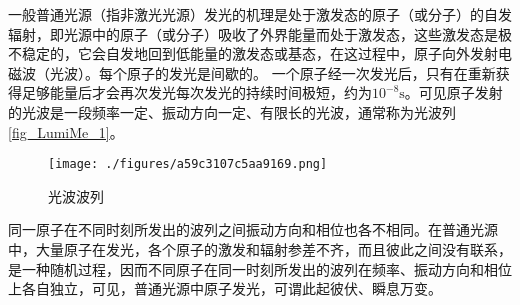 
一般普通光源（指非激光光源）发光的机理是处于激发态的原子（或分子）的自发辐射，即光源中的原子（或分子）吸收了外界能量而处于激发态，这些激发态是极不稳定的，它会自发地回到低能量的激发态或基态，在这过程中，原子向外发射电磁波（光波）。每个原子的发光是间歇的。 一个原子经一次发光后，只有在重新获得足够能量后才会再次发光每次发光的持续时间极短，约为$10^{-8}\mathrm s$。可见原子发射的光波是一段频率一定、振动方向一定、有限长的光波，通常称为光波列\autoref{fig_LumiMe_1}。
\begin{figure}[ht]
\centering
\texttt{[image: ./figures/a59c3107c5aa9169.png]}
\caption{光波波列} \label{fig_LumiMe_1}
\end{figure}

同一原子在不同时刻所发出的波列之间振动方向和相位也各不相同。在普通光源中，大量原子在发光，各个原子的激发和辐射参差不齐，而且彼此之间没有联系，是一种随机过程，因而不同原子在同一时刻所发出的波列在频率、振动方向和相位上各自独立，可见，普通光源中原子发光，可谓此起彼伏、瞬息万变。
